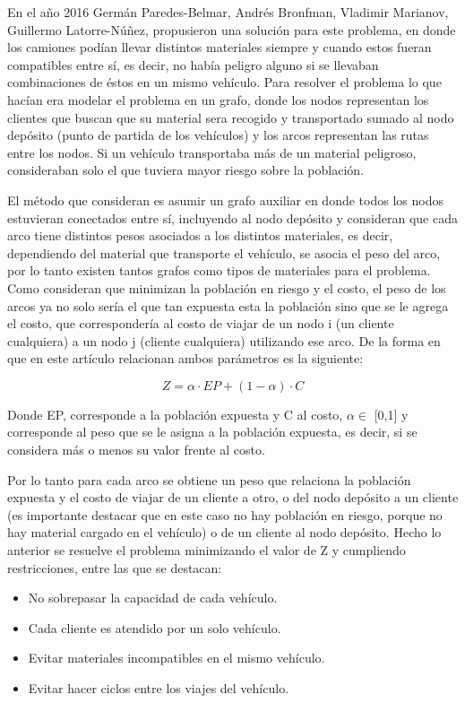 \documentclass[conference]{IEEEtran}
\begin{document}
En el a\~no 2016 \cite{b2}  Germ\'an Paredes-Belmar, Andr\'es Bronfman, Vladimir Marianov, Guillermo Latorre-N\'u\~nez, propusieron una soluci\'on para este problema, en donde los camiones pod\'ian llevar distintos materiales siempre y cuando estos fueran compatibles entre s\'i, es decir, no hab\'ia peligro alguno si se llevaban combinaciones de \'estos en un mismo veh\'iculo. Para resolver el problema lo que hac\'ian era modelar el problema en un grafo, donde los nodos representan los clientes que buscan que su material sera recogido y transportado sumado al nodo dep\'osito (punto de partida de los veh\'iculos) y los arcos representan las rutas entre los nodos. Si un veh\'iculo transportaba m\'as de un material peligroso, consideraban solo el que tuviera mayor riesgo sobre la poblaci\'on.

El m\'etodo que consideran es asumir un grafo auxiliar en donde todos los nodos estuvieran conectados entre s\'i, incluyendo al nodo dep\'osito y consideran que cada arco tiene distintos pesos asociados a los distintos materiales, es decir, dependiendo del material que transporte el veh\'iculo, se asocia el peso del arco, por lo tanto existen tantos grafos como tipos de materiales para el problema. Como consideran que minimizan la poblaci\'on en riesgo y el costo, el peso de los arcos ya no solo ser\'ia el que tan expuesta esta la poblaci\'on sino que se le agrega el costo, que corresponder\'ia al costo de viajar de un nodo i (un cliente cualquiera) a un nodo j (cliente cualquiera) utilizando ese arco. De la forma en que en este art\'iculo relacionan ambos par\'ametros es la siguiente: 

           \[Z = \alpha \cdot EP + (1 - \alpha) \cdot C\]
           
Donde EP, corresponde a la poblaci\'on expuesta y C al costo, $\alpha \in $ [0,1] y corresponde al peso que se le asigna a la poblaci\'on expuesta, es decir, si se considera m\'as o menos su valor frente al costo. 

Por lo tanto para cada arco se obtiene un peso que relaciona la poblaci\'on expuesta y el costo de viajar de un cliente a otro, o del nodo dep\'osito a un cliente (es importante destacar que en este caso no hay poblaci\'on en riesgo, porque no hay material cargado en el veh\'iculo) o de un cliente al nodo dep\'osito. Hecho lo anterior se resuelve el problema minimizando el valor de Z y cumpliendo restricciones, entre las que se destacan:

\begin{itemize}
    \item No sobrepasar la capacidad de cada veh\'iculo.
    \item Cada cliente es atendido por un solo veh\'iculo.
    \item Evitar materiales incompatibles en el mismo veh\'iculo.
    \item Evitar hacer ciclos entre los viajes del veh\'iculo.
\end{itemize}
\end{document}
